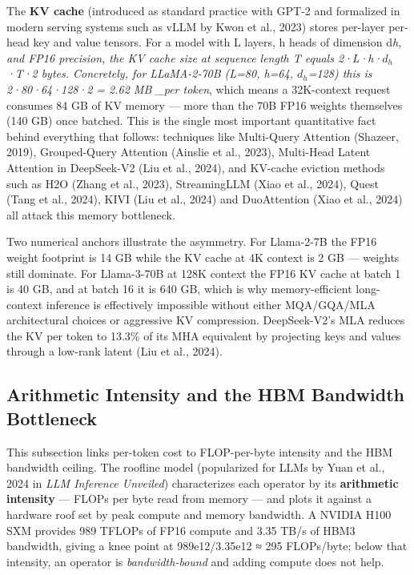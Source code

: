 The \textbf{KV cache} (introduced as standard practice with GPT-2 and formalized in modern serving systems such as vLLM by Kwon et al., 2023) stores per-layer per-head key and value tensors. For a model with L layers, h heads of dimension d\emph{h, and FP16 precision, the KV cache size at sequence length T equals 2·L·h·\(d_h\)·T·2 bytes. Concretely, for LLaMA-2-70B (L=80, h=64, \(d_h\)=128) this is 2·80·64·128·2 = 2.62 MB \_per token}, which means a 32K-context request consumes 84 GB of KV memory --- more than the 70B FP16 weights themselves (140 GB) once batched. This is the single most important quantitative fact behind everything that follows: techniques like Multi-Query Attention (Shazeer, 2019), Grouped-Query Attention (Ainslie et al., 2023), Multi-Head Latent Attention in DeepSeek-V2 (Liu et al., 2024), and KV-cache eviction methods such as H2O (Zhang et al., 2023), StreamingLLM (Xiao et al., 2024), Quest (Tang et al., 2024), KIVI (Liu et al., 2024) and DuoAttention (Xiao et al., 2024) all attack this memory bottleneck.

Two numerical anchors illustrate the asymmetry. For Llama-2-7B the FP16 weight footprint is 14 GB while the KV cache at 4K context is 2 GB --- weights still dominate. For Llama-3-70B at 128K context the FP16 KV cache at batch 1 is 40 GB, and at batch 16 it is 640 GB, which is why memory-efficient long-context inference is effectively impossible without either MQA/GQA/MLA architectural choices or aggressive KV compression. DeepSeek-V2's MLA reduces the KV per token to 13.3\% of its MHA equivalent by projecting keys and values through a low-rank latent (Liu et al., 2024).

\subsection{Arithmetic Intensity and the HBM Bandwidth Bottleneck}\label{arithmetic-intensity-and-the-hbm-bandwidth-bottleneck}

This subsection links per-token cost to FLOP-per-byte intensity and the HBM bandwidth ceiling. The roofline model (popularized for LLMs by Yuan et al., 2024 in \emph{LLM Inference Unveiled}) characterizes each operator by its \textbf{arithmetic intensity} --- FLOPs per byte read from memory --- and plots it against a hardware roof set by peak compute and memory bandwidth. A NVIDIA H100 SXM provides 989 TFLOPs of FP16 compute and 3.35 TB/s of HBM3 bandwidth, giving a knee point at 989e12/3.35e12 ≈ 295 FLOPs/byte; below that intensity, an operator is \emph{bandwidth-bound} and adding compute does not help.

